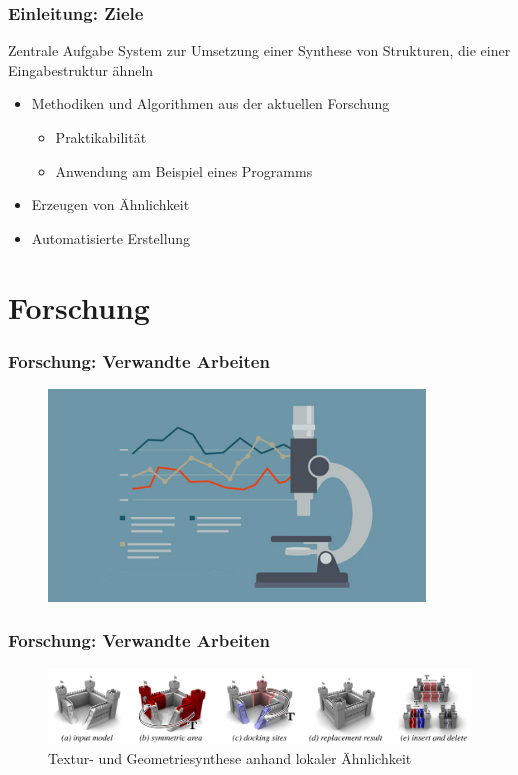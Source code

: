 \documentclass[12pt]{beamer}
\begin{document}
    \begin{frame}
        \frametitle{Einleitung: Ziele}

        \begin{block}{Zentrale Aufgabe}
            System zur Umsetzung einer Synthese von Strukturen, die einer Eingabestruktur ähneln
        \end{block}

        \begin{itemize}
            \setlength\itemsep{1.4em}
            \item<2-> Methodiken und Algorithmen aus der aktuellen Forschung
            \begin{itemize}
                \item Praktikabilität
                \item Anwendung am Beispiel eines Programms
            \end{itemize}
            \item<3-> Erzeugen von Ähnlichkeit
            \item<4-> Automatisierte Erstellung
        \end{itemize}
    \end{frame}

    \section{Forschung}
    \label{sec:forschung}
    \begin{frame}
        \frametitle{Forschung: Verwandte Arbeiten}

        \begin{figure}
            \centering
            \includegraphics[width=10cm]{../images/forschung.jpg}
        \end{figure}
    \end{frame}

    \begin{frame}
        \frametitle{Forschung: Verwandte Arbeiten}

        \begin{figure}
            \centering
            \includegraphics[width=12cm]{../images/bokeloh_2010_system.PNG}
            \caption{Textur- und Geometriesynthese anhand lokaler Ähnlichkeit}
        \end{figure}
    \end{frame}
\end{document}
